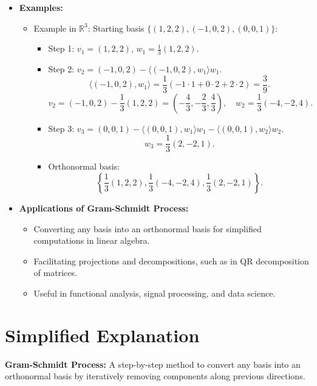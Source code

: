 \documentclass{article}
\begin{document}
\begin{itemize}
  \item \textbf{Examples:}
    \begin{itemize}
      \item Example in $\mathbb{R}^3$: Starting basis $\{(1, 2, 2), (-1, 0, 2), (0, 0, 1)\}$:
        \begin{itemize}
          \item Step 1: $v_1 = (1, 2, 2)$, $w_1 = \frac{1}{3}(1, 2, 2)$.
          \item Step 2: $v_2 = (-1, 0, 2) - \langle (-1, 0, 2), w_1 \rangle w_1$.
            \[
              \langle (-1, 0, 2), w_1 \rangle = \frac{1}{3}(-1 \cdot 1 + 0 \cdot 2 + 2 \cdot 2) = \frac{3}{9}.
            \]
            \[
              v_2 = (-1, 0, 2) - \frac{1}{3}(1, 2, 2) = (-\frac{4}{3}, -\frac{2}{3}, \frac{4}{3}), \quad w_2 = \frac{1}{3}(-4, -2, 4).
            \]
          \item Step 3: $v_3 = (0, 0, 1) - \langle (0, 0, 1), w_1 \rangle w_1 - \langle (0, 0, 1), w_2 \rangle w_2$.
            \[
              w_3 = \frac{1}{3}(2, -2, 1).
            \]
          \item Orthonormal basis:
            \[
              \left\{\frac{1}{3}(1, 2, 2), \frac{1}{3}(-4, -2, 4), \frac{1}{3}(2, -2, 1)\right\}.
            \]
        \end{itemize}
    \end{itemize}

  \item \textbf{Applications of Gram-Schmidt Process:}
    \begin{itemize}
      \item Converting any basis into an orthonormal basis for simplified computations in linear algebra.
      \item Facilitating projections and decompositions, such as in QR decomposition of matrices.
      \item Useful in functional analysis, signal processing, and data science.
    \end{itemize}
\end{itemize}

\section*{Simplified Explanation}

\textbf{Gram-Schmidt Process:}
A step-by-step method to convert any basis into an orthonormal basis by iteratively removing components along previous directions.
\end{document}
